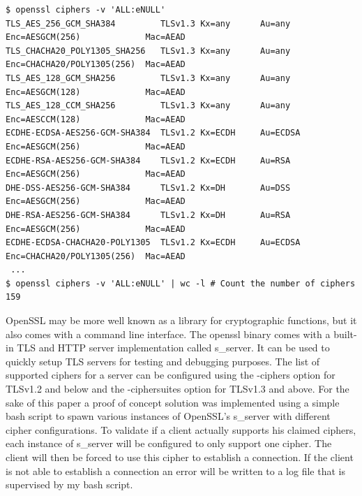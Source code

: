 \documentclass[12pt]{scrbook}
\begin{document}
\begin{lstlisting}[breaklines=true,basicstyle=\tiny,caption={Listing supported
            ciphers and counting them in a shell},captionpos=b]
$ openssl ciphers -v 'ALL:eNULL'
TLS_AES_256_GCM_SHA384         TLSv1.3 Kx=any      Au=any   Enc=AESGCM(256)             Mac=AEAD
TLS_CHACHA20_POLY1305_SHA256   TLSv1.3 Kx=any      Au=any   Enc=CHACHA20/POLY1305(256)  Mac=AEAD
TLS_AES_128_GCM_SHA256         TLSv1.3 Kx=any      Au=any   Enc=AESGCM(128)             Mac=AEAD
TLS_AES_128_CCM_SHA256         TLSv1.3 Kx=any      Au=any   Enc=AESCCM(128)             Mac=AEAD
ECDHE-ECDSA-AES256-GCM-SHA384  TLSv1.2 Kx=ECDH     Au=ECDSA Enc=AESGCM(256)             Mac=AEAD
ECDHE-RSA-AES256-GCM-SHA384    TLSv1.2 Kx=ECDH     Au=RSA   Enc=AESGCM(256)             Mac=AEAD
DHE-DSS-AES256-GCM-SHA384      TLSv1.2 Kx=DH       Au=DSS   Enc=AESGCM(256)             Mac=AEAD
DHE-RSA-AES256-GCM-SHA384      TLSv1.2 Kx=DH       Au=RSA   Enc=AESGCM(256)             Mac=AEAD
ECDHE-ECDSA-CHACHA20-POLY1305  TLSv1.2 Kx=ECDH     Au=ECDSA Enc=CHACHA20/POLY1305(256)  Mac=AEAD
 ...
$ openssl ciphers -v 'ALL:eNULL' | wc -l # Count the number of ciphers
159
    \end{lstlisting}

OpenSSL may be more well known as a library for cryptographic functions, but it
also comes with a command line interface. The openssl binary comes with a
built-in TLS and HTTP server implementation called s\_server. It can be used to
quickly setup TLS servers for testing and debugging purposes. The list of
supported ciphers for a server can be configured using the -ciphers option for
TLSv1.2 and below and the -ciphersuites option for TLSv1.3 and above. For the
sake of this paper a proof of concept solution was implemented using a simple
bash script to spawn various instances of OpenSSL's s\_server with different
cipher configurations. To validate if a client actually supports his claimed
ciphers, each instance of s\_server will be configured to only support one
cipher. The client will then be forced to use this cipher to establish a
connection. If the client is not able to establish a connection an error will be
written to a log file that is supervised by my bash script.
\end{document}
